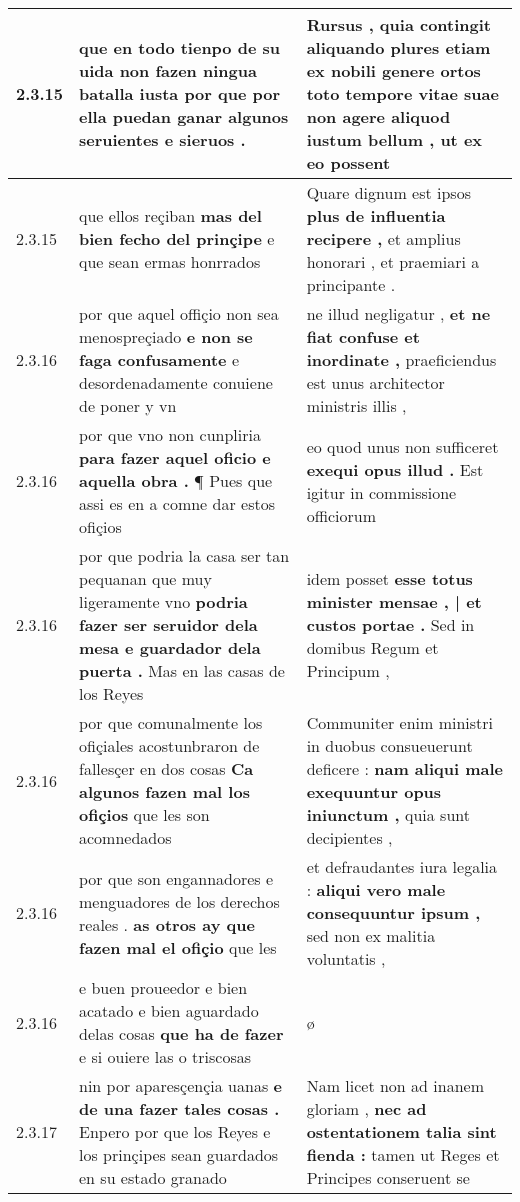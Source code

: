 \begin{tabular}{|p{1cm}|p{6.5cm}|p{6.5cm}|}
2.3.15 & que en todo tienpo de su uida \textbf{ non fazen ningua batalla iusta } por que por ella puedan ganar algunos seruientes e sieruos . & Rursus , quia contingit aliquando plures etiam ex nobili genere ortos toto tempore vitae suae \textbf{ non agere aliquod iustum bellum , } ut ex eo possent \\\hline
2.3.15 & que ellos reçiban \textbf{ mas del bien fecho del prinçipe } e que sean ermas honrrados & Quare dignum est ipsos \textbf{ plus de influentia recipere , } et amplius honorari , et praemiari a principante . \\\hline
2.3.16 & por que aquel offiçio non sea menospreçiado \textbf{ e non se faga confusamente } e desordenadamente conuiene de poner y vn & ne illud negligatur , \textbf{ et ne fiat confuse et inordinate , } praeficiendus est unus architector ministris illis , \\\hline
2.3.16 & por que vno non cunpliria \textbf{ para fazer aquel oficio e aquella obra . } ¶ Pues que assi es en a comne dar estos ofiçios & eo quod unus non sufficeret \textbf{ exequi opus illud . } Est igitur in commissione officiorum \\\hline
2.3.16 & por que podria la casa ser tan pequanan que muy ligeramente vno \textbf{ podria fazer ser seruidor dela mesa e guardador dela puerta . } Mas en las casas de los Reyes & idem posset \textbf{ esse totus minister mensae , | et custos portae . } Sed in domibus Regum et Principum , \\\hline
2.3.16 & por que comunalmente los ofiçiales acostunbraron de fallesçer en dos cosas \textbf{ Ca algunos fazen mal los ofiçios } que les son acomnedados & Communiter enim ministri in duobus consueuerunt deficere : \textbf{ nam aliqui male exequuntur opus iniunctum , } quia sunt decipientes , \\\hline
2.3.16 & por que son engannadores e menguadores de los derechos reales . \textbf{ as otros ay que fazen mal el ofiçio } que les & et defraudantes iura legalia : \textbf{ aliqui vero male consequuntur ipsum , } sed non ex malitia voluntatis , \\\hline
2.3.16 & e buen proueedor e bien acatado e bien aguardado delas cosas \textbf{ que ha de fazer } e si ouiere las o triscosas & ø \\\hline
2.3.17 & nin por aparesçençia uanas \textbf{ e de una fazer tales cosas . } Enpero por que los Reyes e los prinçipes sean guardados en su estado granado & Nam licet non ad inanem gloriam , \textbf{ nec ad ostentationem talia sint fienda : } tamen ut Reges et Principes conseruent se \\\hline

\end{tabular}
